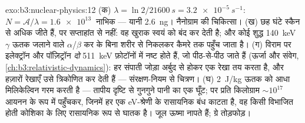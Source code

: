 \begin{solution}{exo:b3:nuclear-physics:12}
(क) $\lambda = \ln2/\qty{21600}{s} = \qty{3.2e-5}{s^{-1}}$:
$N = \mathcal A/\lambda = \qty{1.6e13}{}$ नाभिक ---
यानी \qty{2.6}{ng}। नैनोग्राम की चिकित्सा। (ख) छह घंटे स्कैन से
अधिक जीते हैं, पर सप्ताहांत से नहीं: वह खुराक स्वयं को बंद कर देती
है; और कोई शुद्ध \qty{140}{keV} $\gamma$ ऊतक जलाने वाले
$\alpha$/$\beta$ कर के बिना शरीर से निकलकर कैमरे तक पहुँच जाता है।
(ग) विराम पर इलेक्ट्रॉन
और पॉज़िट्रॉन \emph{दो} \qty{511}{keV} फ़ोटॉनों में नष्ट होते हैं,
जो पीठ-से-पीठ जाते हैं (ऊर्जा और संवेग,
\cref{ch:b3:relativistic-dynamics}): हर संपाती जोड़ा
अर्बुद से होकर एक रेखा तय करता है, और हज़ारों रेखाएँ
उसे त्रिकोणित कर देती हैं --- संरक्षण-नियम से चित्रण। (घ)
\qty{2}{J/kg} ऊतक को आधा मिलिकेल्विन गरम करती है --- तापीय दृष्टि से
गुनगुने पानी का एक घूँट; पर प्रति किलोग्राम ${\sim}10^{17}$ आयनन के
रूप में पहुँचकर, जिनमें हर एक \unit{eV}-श्रेणी के रासायनिक बंध काटता
है, वह किसी विभाजित होती कोशिका के लिए रासायनिक रूप से घातक है।
जूल ऊष्मा नापते हैं; ग्रे तोड़फोड़।
\end{solution}

